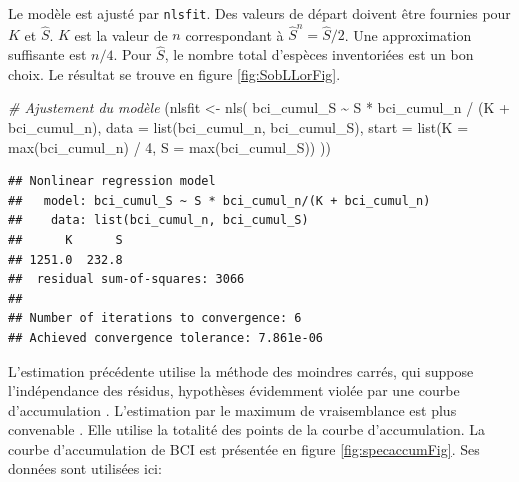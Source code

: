 \documentclass[
  11pt,
  american,
  a4paper,
  extrafontsizes,onecolumn,openright
  ]{memoir}
\newenvironment{Shaded}{\begin{snugshade}}{\end{snugshade}}
\newcommand{\AttributeTok}[1]{\textcolor[rgb]{0.77,0.63,0.00}{#1}}
\newcommand{\CommentTok}[1]{\textcolor[rgb]{0.56,0.35,0.01}{\textit{#1}}}
\newcommand{\DecValTok}[1]{\textcolor[rgb]{0.00,0.00,0.81}{#1}}
\newcommand{\FunctionTok}[1]{\textcolor[rgb]{0.00,0.00,0.00}{#1}}
\newcommand{\NormalTok}[1]{#1}
\newcommand{\OtherTok}[1]{\textcolor[rgb]{0.56,0.35,0.01}{#1}}
\newcommand{\SpecialCharTok}[1]{\textcolor[rgb]{0.00,0.00,0.00}{#1}}
\begin{document}
\normalsize

Le modèle est ajusté par \texttt{nlsfit}.
Des valeurs de départ doivent être fournies pour \(K\) et \(\hat{S}\).
\(K\) est la valeur de \(n\) correspondant à \(\hat{S}^{n} = \hat{S} / 2\).
Une approximation suffisante est \(n / 4\).
Pour \(\hat{S}\), le nombre total d'espèces inventoriées est un bon choix.
Le résultat se trouve en figure \ref{fig:SobLLorFig}.

\scriptsize

\begin{Shaded}
\begin{Highlighting}[]
\CommentTok{\# Ajustement du modèle}
\NormalTok{(nlsfit }\OtherTok{\textless{}{-}} \FunctionTok{nls}\NormalTok{(}
\NormalTok{  bci\_cumul\_S }\SpecialCharTok{\textasciitilde{}}\NormalTok{ S }\SpecialCharTok{*}\NormalTok{ bci\_cumul\_n }\SpecialCharTok{/}\NormalTok{ (K }\SpecialCharTok{+}\NormalTok{ bci\_cumul\_n), }
  \AttributeTok{data =} \FunctionTok{list}\NormalTok{(bci\_cumul\_n, bci\_cumul\_S), }
  \AttributeTok{start =} \FunctionTok{list}\NormalTok{(}\AttributeTok{K =} \FunctionTok{max}\NormalTok{(bci\_cumul\_n) }\SpecialCharTok{/} \DecValTok{4}\NormalTok{, }\AttributeTok{S =} \FunctionTok{max}\NormalTok{(bci\_cumul\_S))}
\NormalTok{))}
\end{Highlighting}
\end{Shaded}

\begin{verbatim}
## Nonlinear regression model
##   model: bci_cumul_S ~ S * bci_cumul_n/(K + bci_cumul_n)
##    data: list(bci_cumul_n, bci_cumul_S)
##      K      S 
## 1251.0  232.8 
##  residual sum-of-squares: 3066
## 
## Number of iterations to convergence: 6 
## Achieved convergence tolerance: 7.861e-06
\end{verbatim}

\normalsize

L'estimation précédente utilise la méthode des moindres carrés, qui suppose l'indépendance des résidus, hypothèses évidemment violée par une courbe d'accumulation \autocite{Colwell1994}.
L'estimation par le maximum de vraisemblance est plus convenable \autocite{Raaijmakers1987}.
Elle utilise la totalité des points de la courbe d'accumulation.
La courbe d'accumulation de BCI est présentée en figure \ref{fig:specaccumFig}.
Ses données sont utilisées ici:

\scriptsize
\end{document}
